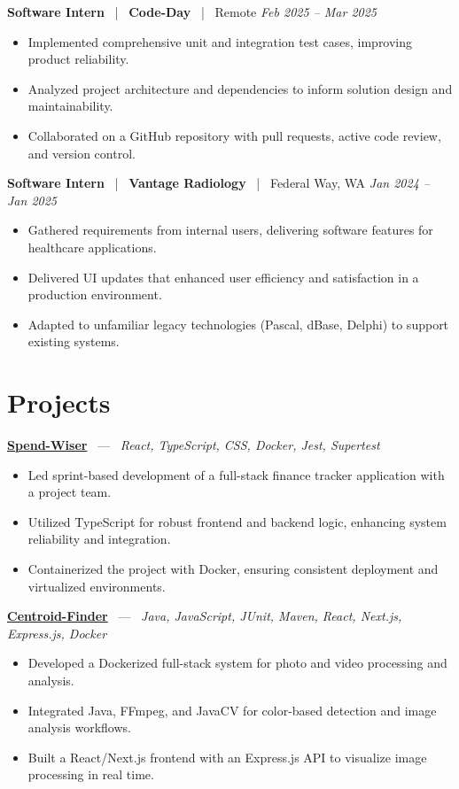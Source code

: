 \documentclass[10pt, letterpaper]{article}
\newcommand{\jobhead}[4]{%
  \vspace{5pt}%
  {\bfseries\color{dark}#1}%
  ~{\color{light}|}~%
  {\bfseries\color{navy}#2}%
  ~{\color{light}|}~%
  {\color{light}#3}%
  \hfill{\color{light}\small\textit{#4}}\\[-2pt]%
}
\newcommand{\projhead}[3]{%
  \vspace{5pt}%
  {\bfseries\color{dark}\href{#2}{#1}}%
  ~{\color{light}---}~%
  {\color{light}\small\textit{#3}}\\[-2pt]%
}
\begin{document}
\jobhead{Software Intern}{Code-Day}{Remote}{Feb 2025 – Mar 2025}
\begin{itemize}
  \item Implemented comprehensive unit and integration test cases, improving product reliability.
  \item Analyzed project architecture and dependencies to inform solution design and maintainability.
  \item Collaborated on a GitHub repository with pull requests, active code review, and version control.
\end{itemize}

\jobhead{Software Intern}{Vantage Radiology}{Federal Way, WA}{Jan 2024 – Jan 2025}
\begin{itemize}
  \item Gathered requirements from internal users, delivering software features for healthcare applications.
  \item Delivered UI updates that enhanced user efficiency and satisfaction in a production environment.
  \item Adapted to unfamiliar legacy technologies (Pascal, dBase, Delphi) to support existing systems.
\end{itemize}

\section{Projects}

\projhead{Spend-Wiser}{https://github.com/JesseChum/w26-sdev372-spendwiser-finance-tracker}{React, TypeScript, CSS, Docker, Jest, Supertest}
\begin{itemize}
  \item Led sprint-based development of a full-stack finance tracker application with a project team.
  \item Utilized TypeScript for robust frontend and backend logic, enhancing system reliability and integration.
  \item Containerized the project with Docker, ensuring consistent deployment and virtualized environments.
\end{itemize}

\projhead{Centroid-Finder}{https://github.com/xavierb117/centroid-finder}{Java, JavaScript, JUnit, Maven, React, Next.js, Express.js, Docker}
\begin{itemize}
  \item Developed a Dockerized full-stack system for photo and video processing and analysis.
  \item Integrated Java, FFmpeg, and JavaCV for color-based detection and image analysis workflows.
  \item Built a React/Next.js frontend with an Express.js API to visualize image processing in real time.
\end{itemize}
\end{document}
